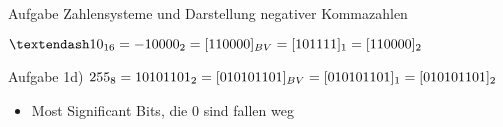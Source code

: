 \begin{frame}[allowframebreaks]{Aufgabe \thesection}{Zahlensysteme und Darstellung negativer Kommazahlen}
\begin{solution}
    $–10_{16} = - 1 0000_2 \newline\newline = [11 0000]_{BV} \newline\newline = [10 1111]_1 \newline\newline = [11 0000]_2$  
  \end{solution}
  \begin{solutionnoinc}
    Aufgabe 1d)\newline\newline
    $255_{8} = 10 101 101_2 \newline\newline = [010 101 101]_{BV} \newline\newline = [010 101 101]_{1} \newline\newline = [010 101 101]_{2}$
  \end{solutionnoinc}
  \begin{Sidenote}
    \begin{itemize}
      \item Most Significant Bits, die $0$ sind fallen weg
    \end{itemize}
  \end{Sidenote}
\end{frame}
